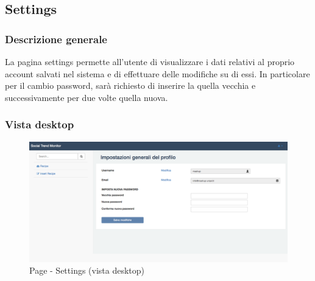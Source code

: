 	\subsection{Settings} %
	\label{sub:settings}
		\subsubsection{Descrizione generale} %
		La pagina settings permette all'utente di visualizzare i dati relativi al proprio account salvati nel sistema e di effettuare delle modifiche su di essi. In particolare per il cambio password, sarà richiesto di inserire la quella vecchia e successivamente per due volte quella nuova.

		\subsubsection{Vista desktop} %
		\begin{figure}[htbp]
			\centering
			\centerline{\includegraphics[scale=0.4]{./images/mockup/settings_vd.pdf}}
			\caption{Page - Settings (vista desktop)}
		\end{figure}


